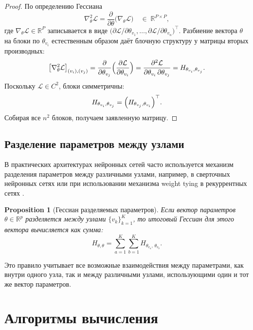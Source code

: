 \documentclass[11pt]{article}
\newtheorem{proposition}{Proposition}
\begin{document}
\begin{proof}
  По определению Гессиана
  \[
    \nabla^2_\theta \mathcal L
    = \frac{\partial}{\partial\theta}
    \bigl(\nabla_\theta \mathcal L\bigr)
    \quad\in\;\mathbb R^{P\times P},
  \]
  где $\nabla_\theta \mathcal L\in\mathbb R^P$ записывается в виде
  \(\bigl(\partial \mathcal L/\partial\theta_{v_1}, \ldots,
  \partial \mathcal L/\partial\theta_{v_n}\bigr)^\top\).
  Разбиение вектора $\theta$ на блоки по $\theta_{v_i}$ естественным образом
  даёт блочную структуру у матрицы вторых производных:
  \[
    \bigl[\nabla^2_\theta\mathcal L\bigr]_{(v_i),(v_j)}
    = \frac{\partial}{\partial\theta_{v_j}}
    \Bigl(\frac{\partial \mathcal L}{\partial\theta_{v_i}}\Bigr)
    = \frac{\partial^2 \mathcal L}{\partial\theta_{v_i}\,\partial\theta_{v_j}}
    = H_{\theta_{v_i},\theta_{v_j}}.
  \]
  Поскольку $\mathcal L\in C^2$, блоки симметричны:
  \[
    H_{\theta_{v_i},\theta_{v_j}}
    = \Bigl(H_{\theta_{v_j},\theta_{v_i}}\Bigr)^\top.
  \]
  Собирая все $n^2$ блоков, получаем заявленную матрицу.
\end{proof}

\subsection{Разделение параметров между узлами}

В практических архитектурах нейронных сетей часто используется механизм разделения параметров между
различными узлами, например, в сверточных нейронных сетях или при использовании механизма weight tying в
рекуррентных сетях \citep{pascanu2013difficulty}.

\begin{proposition}[Гессиан разделяемых параметров]
  \label{prop:shared-params}
  Если вектор параметров $\theta\in\mathbb{R}^p$ разделяется между узлами $\{v_k\}_{k=1}^K$, то итоговый
  Гессиан для этого вектора вычисляется как сумма:
  \[
    H_{\theta,\theta}
    = \sum_{a=1}^K\sum_{b=1}^K
    H_{\theta_{v_a},\,\theta_{v_b}}.
  \]
\end{proposition}

Это правило учитывает все возможные взаимодействия между параметрами, как внутри одного узла, так и между
различными узлами, использующими один и тот же вектор параметров.

\newpage

\section{Алгоритмы вычисления}
\end{document}
